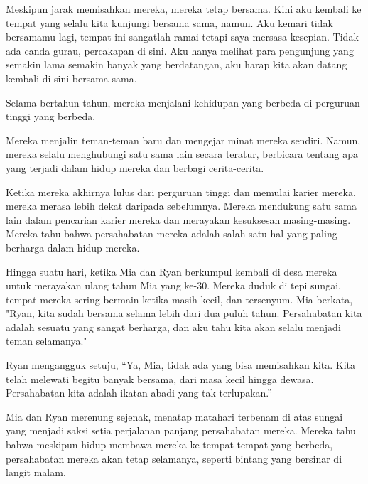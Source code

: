 Meskipun jarak memisahkan mereka, mereka tetap bersama. Kini aku kembali ke tempat yang selalu kita kunjungi bersama sama, namun. Aku kemari tidak bersamamu lagi, tempat ini sangatlah ramai tetapi saya mersasa kesepian. Tidak ada canda gurau, percakapan di sini. Aku hanya melihat para pengunjung yang semakin lama semakin banyak yang berdatangan, aku harap kita akan datang kembali di sini bersama sama.


Selama bertahun-tahun, mereka menjalani kehidupan yang berbeda di perguruan tinggi yang berbeda.


Mereka menjalin teman-teman baru dan mengejar minat mereka sendiri. Namun, mereka selalu menghubungi satu sama lain secara teratur, berbicara tentang apa yang terjadi dalam hidup mereka dan berbagi cerita-cerita.


Ketika mereka akhirnya lulus dari perguruan tinggi dan memulai karier mereka, mereka merasa lebih dekat daripada sebelumnya. Mereka mendukung satu sama lain dalam pencarian karier mereka dan merayakan kesuksesan masing-masing. Mereka tahu bahwa persahabatan mereka adalah salah satu hal yang paling berharga dalam hidup mereka.


Hingga suatu hari, ketika Mia dan Ryan berkumpul kembali di desa mereka untuk merayakan ulang tahun Mia yang ke-30. Mereka duduk di tepi sungai, tempat mereka sering bermain ketika masih kecil, dan tersenyum. Mia berkata, "Ryan, kita sudah bersama selama lebih dari dua puluh tahun. Persahabatan kita adalah sesuatu yang sangat berharga, dan aku tahu kita akan selalu menjadi teman selamanya."


Ryan mengangguk setuju, ``Ya, Mia, tidak ada yang bisa memisahkan kita. Kita telah melewati begitu banyak bersama, dari masa kecil hingga dewasa. Persahabatan kita adalah ikatan abadi yang tak terlupakan.''


Mia dan Ryan merenung sejenak, menatap matahari terbenam di atas sungai yang menjadi saksi setia perjalanan panjang persahabatan mereka. Mereka tahu bahwa meskipun hidup membawa mereka ke tempat-tempat yang berbeda, persahabatan mereka akan tetap selamanya, seperti bintang yang bersinar di langit malam.

\jedahias
